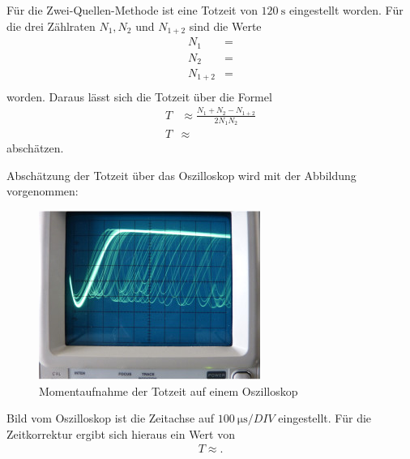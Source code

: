 Für die Zwei-Quellen-Methode ist eine Totzeit von $\SI{120}{\second} $ eingestellt worden.
Für die drei Zählraten $N_1, N_2$ und $N_{1+2} $ sind die Werte
\begin{align}
    N_1&= \text{} \label{eq:5} \\
    N_2&= \text{} \label{eq:6} \\
    N_{1+2}&= \text{} \label{eq:7} \\
\end{align}
\justifying worden.
Daraus lässt sich die Totzeit über die Formel \cite{V703}
\begin{align}
    T &\approx \frac{N_1+N_2-N_{1+2}}{2N_1 N_2} \label{eq:8}\\
    T &\approx \text{} \label{eq:9}
\end{align}
abschätzen.

\justifying Abschätzung der Totzeit über das Oszilloskop wird mit der Abbildung vorgenommen:
\begin{figure}[H]
    \centering
    \includegraphics[width=\linewidth]{images/oszi.jpg}
    \caption{Momentaufnahme der Totzeit auf einem Oszilloskop\cite{matplotlib}}
    \label{fig:8}
\end{figure}
\justifying  Bild vom Oszilloskop ist die Zeitachse auf  $\SI{100}{\micro\second}/DIV $
eingestellt.
Für die Zeitkorrektur ergibt sich hieraus ein Wert von
\begin{align}
    T \approx  \label{eq:10} .
\end{align}


